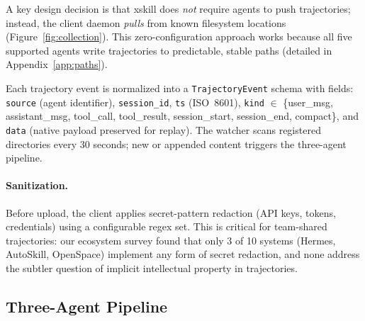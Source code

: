 \documentclass[11pt]{article}
\begin{document}
A key design decision is that xskill does \emph{not} require agents to push trajectories; instead, the client daemon \emph{pulls} from known filesystem locations (Figure~\ref{fig:collection}). This zero-configuration approach works because all five supported agents write trajectories to predictable, stable paths (detailed in Appendix~\ref{app:paths}).

Each trajectory event is normalized into a \texttt{TrajectoryEvent} schema with fields: \texttt{source} (agent identifier), \texttt{session\_id}, \texttt{ts} (ISO~8601), \texttt{kind} $\in$ \{user\_msg, assistant\_msg, tool\_call, tool\_result, session\_start, session\_end, compact\}, and \texttt{data} (native payload preserved for replay). The watcher scans registered directories every 30 seconds; new or appended content triggers the three-agent pipeline.

\paragraph{Sanitization.} Before upload, the client applies secret-pattern redaction (API keys, tokens, credentials) using a configurable regex set. This is critical for team-shared trajectories: our ecosystem survey found that only 3 of 10 systems (Hermes, AutoSkill, OpenSpace) implement any form of secret redaction, and none address the subtler question of implicit intellectual property in trajectories.

\subsection{Three-Agent Pipeline}
\label{sec:pipeline}
\end{document}
